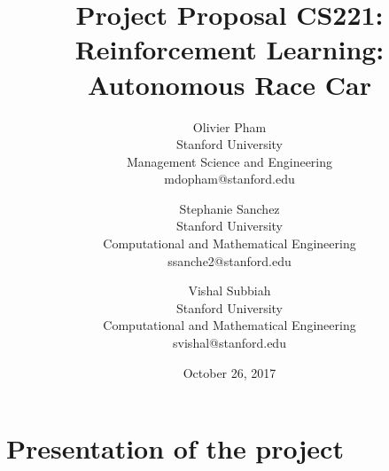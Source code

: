 \documentclass[10pt,twocolumn,letterpaper]{article}
\date{October 26, 2017}
\begin{document}
\title{{Project Proposal CS221: Reinforcement Learning: Autonomous Race Car}}

\author{Olivier Pham\\
Stanford University\\
Management Science and Engineering\\
 {mdopham@stanford.edu}
\and
Stephanie Sanchez\\
Stanford University\\
Computational and Mathematical Engineering\\
{ ssanche2@stanford.edu}
\and
Vishal Subbiah\\
Stanford University\\
Computational and Mathematical Engineering\\
{svishal@stanford.edu}
}
\maketitle

  


\section*{Presentation of the project}

\end{document}
